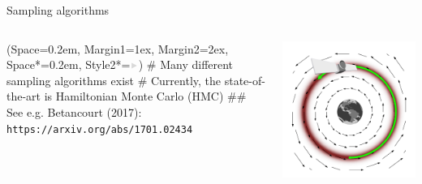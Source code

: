 \documentclass[12pt, aspectratio=149]{beamer}
\newcommand{\listSpace}{0.2em}
\theoremstyle{plain}
\begin{document}
\begin{frame}[fragile]{Sampling algorithms}
	\begin{columns}
		\begin{column}{0.5\linewidth}
			\begin{easylist}[itemize]
				\ListProperties(Space=\listSpace, Margin1=1ex, Margin2=2ex, Space*=\listSpace, Style2*=$\color{bggraydark}\blacktriangleright$\space)
				# Many different sampling algorithms exist
				# Currently, the state-of-the-art is Hamiltonian Monte Carlo (HMC)
				## See e.g. Betancourt (2017): \footnotesize\texttt{https://arxiv.org/abs/1701.02434}
			\end{easylist}
		\end{column}
		\begin{column}{0.5\textwidth}
			\includegraphics[width=\textwidth]{figs/hmc.png}
		\end{column}
	\end{columns}
\end{frame}
\end{document}
